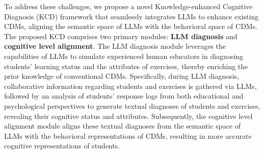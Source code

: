 
To address these challenges, we propose a novel Knowledge-enhanced Cognitive Diagnosis (KCD) framework that seamlessly integrates LLMs to enhance existing CDMs, aligning the semantic space of LLMs with the behavioral space of CDMs. 
The proposed KCD comprises two primary modules: \textbf{LLM diagnosis} and \textbf{cognitive level alignment}. The LLM diagnosis module leverages the capabilities of LLMs to simulate experienced human educators in diagnosing students' learning status and the attributes of exercises, thereby enriching the prior knowledge of conventional CDMs. Specifically, during LLM diagnosis, collaborative information regarding students and exercises is gathered via LLMs, followed by an analysis of students' response logs from both educational and psychological perspectives to generate textual diagnoses of students and exercises, revealing their cognitive status and attributes. 
Subsequently, the cognitive level alignment module aligns these textual diagnoses from the semantic space of LLMs with the behavioral representations of CDMs, resulting in more accurate cognitive representations of students.


